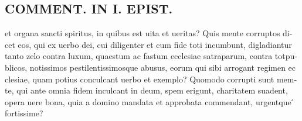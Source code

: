 \documentclass{article}
\begin{document}
\begin{pages}
\section*{COMMENT. IN I. EPIST. }
\marginpar{[ p.532 ]}\pstart et organa sancti spiritus, in quibus est uita et ueritas? Quis mente corruptos di- cet eos, qui ex uerbo dei, cui diligenter et cum fide toti incumbunt, digladiantur tanto zelo contra luxum, quaestum ac fastum ecclesiae satraparum, contra totpu- blicos, notissimos pestilentissimosque abusus, eorum qui sibi arrogant regimen ec clesiae, quam potius conculcant uerbo et exemplo? Quomodo corrupti sunt mem- te, qui ante omnia fidem inculcant in deum, spem erigunt, charitatem suadent, opera uere bona, quia a domino mandata et approbata commendant, urgentque ́ fortissime?  \pend
{}
{}

\end{pages}
\end{document}
